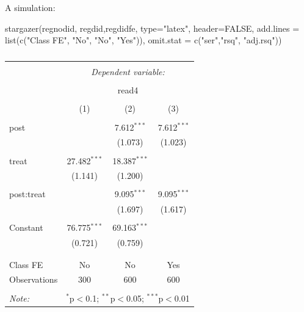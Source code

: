 \documentclass[
  ignorenonframetext,
]{beamer}
\newenvironment{Shaded}{\begin{snugshade}}{\end{snugshade}}
\newcommand{\AttributeTok}[1]{\textcolor[rgb]{0.77,0.63,0.00}{#1}}
\newcommand{\ConstantTok}[1]{\textcolor[rgb]{0.00,0.00,0.00}{#1}}
\newcommand{\FunctionTok}[1]{\textcolor[rgb]{0.00,0.00,0.00}{#1}}
\newcommand{\NormalTok}[1]{#1}
\newcommand{\StringTok}[1]{\textcolor[rgb]{0.31,0.60,0.02}{#1}}
\begin{document}
\begin{frame}[fragile]{A simulation:}
\protect\hypertarget{a-simulation-4}{}
\tiny

\begin{Shaded}
\begin{Highlighting}[]
\FunctionTok{stargazer}\NormalTok{(regnodid, regdid,regdidfe, }\AttributeTok{type=}\StringTok{"latex"}\NormalTok{, }\AttributeTok{header=}\ConstantTok{FALSE}\NormalTok{, }
          \AttributeTok{add.lines =} \FunctionTok{list}\NormalTok{(}\FunctionTok{c}\NormalTok{(}\StringTok{"Class FE"}\NormalTok{, }\StringTok{"No"}\NormalTok{, }\StringTok{"No"}\NormalTok{, }\StringTok{"Yes"}\NormalTok{)), }\AttributeTok{omit.stat =} \FunctionTok{c}\NormalTok{(}\StringTok{"ser"}\NormalTok{,}\StringTok{"rsq"}\NormalTok{, }\StringTok{"adj.rsq"}\NormalTok{))}
\end{Highlighting}
\end{Shaded}

\begin{table}[!htbp] \centering 
  \caption{} 
  \label{} 
\begin{tabular}{@{\extracolsep{5pt}}lccc} 
\\[-1.8ex]\hline 
\hline \\[-1.8ex] 
 & \multicolumn{3}{c}{\textit{Dependent variable:}} \\ 
\cline{2-4} 
\\[-1.8ex] & \multicolumn{3}{c}{read4} \\ 
\\[-1.8ex] & (1) & (2) & (3)\\ 
\hline \\[-1.8ex] 
 post &  & 7.612$^{***}$ & 7.612$^{***}$ \\ 
  &  & (1.073) & (1.023) \\ 
  & & & \\ 
 treat & 27.482$^{***}$ & 18.387$^{***}$ &  \\ 
  & (1.141) & (1.200) &  \\ 
  & & & \\ 
 post:treat &  & 9.095$^{***}$ & 9.095$^{***}$ \\ 
  &  & (1.697) & (1.617) \\ 
  & & & \\ 
 Constant & 76.775$^{***}$ & 69.163$^{***}$ &  \\ 
  & (0.721) & (0.759) &  \\ 
  & & & \\ 
\hline \\[-1.8ex] 
Class FE & No & No & Yes \\ 
Observations & 300 & 600 & 600 \\ 
\hline 
\hline \\[-1.8ex] 
\textit{Note:}  & \multicolumn{3}{r}{$^{*}$p$<$0.1; $^{**}$p$<$0.05; $^{***}$p$<$0.01} \\ 
\end{tabular} 
\end{table}
\end{frame}
\end{document}

